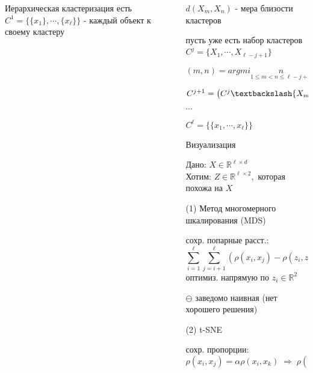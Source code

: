 \documentclass[final]{beamer}
\newlength{\sepwidth}
\newlength{\colwidth}
\newcommand{\separatorcolumn}{\begin{column}{\sepwidth}\end{column}}
\begin{document}
\begin{frame}[t]
\begin{columns}[t]
\begin{column}{\colwidth}
\begin{block}{Иерархическая кластеризация}
{\small есть }$C^1 = \{\{x_1\}, \cdots, \{x_{\ell}\}\}$ - {\small каждый объект к своему кластеру}    
\end{block}
\end{column}
\separatorcolumn
\begin{column}{\colwidth}
$d(X_m, X_n)$ - {\small мера близости кластеров}

{\small пусть уже есть набор кластеров } $C^j = \{X_1, \cdots, X_{\ell - j + 1}\}$

$(m, n) = argmin\limits_{1 \le m < n \le \ell - j + 1} \; d(X_m, X_n)$

$C^{j + 1} = \left( C^j \textbackslash \{X_m, X_n\} \right) \cup \{X_m \cup X_n\} $

$\cdots$

$C^{\ell} = \{\{x_1, \cdots, x_{\ell}\}\}$
\\
\begin{center}
{
}
\end{center}

\begin{block}{Визуализация}

{\small Дано: } $X \in \mathbb{R}^{\ell \times d}$\\
{\small Хотим: } $Z \in \mathbb{R}^{\ell \times 2},$ {\small которая похожа на } $X$

{\small \textcolor{mgr}{(1)} Метод многомерного шкалирования (MDS)}

{\small сохр. попарные расст.:}
\[\sum\limits_{i = 1}^{\ell} \sum\limits_{j = i + 1}^{\ell} (\rho(x_i, x_j) - \rho(z_i, z_j))^2 \to \min\limits_{z_1, \cdots, z_{\ell} \in \mathbb{R}^2} \quad (*)\]
{\small оптимиз. напрямую по } $z_i \in \mathbb{R}^2$

$\ominus$ {\small заведомо наивная (нет хорошего решения)}

{\small \textcolor{mgr}{(2)} t-SNE}

{\small сохр. пропорции:} $\rho(x_i, x_j) = \alpha \rho(x_i, x_k) \; \Rightarrow \; \rho(z_i, z_j) = \alpha \rho(z_i, z_k)$


\end{block}
\end{column}
\end{columns}
\end{frame}
\end{document}
